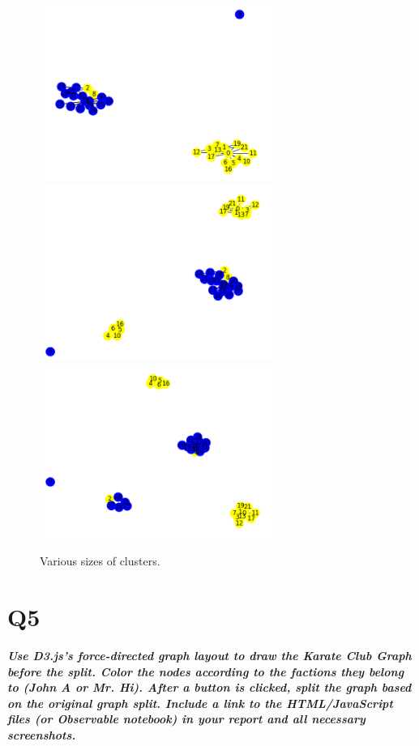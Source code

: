 \documentclass[12pt]{article}
\begin{document}
\\
\begin{figure} 
{\includegraphics[width = 3in]{Figure_13.png}}
{\includegraphics[width = 3in]{Figure_14.png}} 
{\includegraphics[width = 3in]{Figure_15.png}}
\caption{Various sizes of clusters.}
\label{some example}
\end{figure}
\clearpage

\clearpage

\section*{Q5}

\emph{ \textbf{Use D3.js's force-directed graph layout to draw the Karate Club Graph before the split. Color the nodes according to the factions they belong to (John A or Mr. Hi). After a button is clicked, split the graph based on the original graph split. Include a link to the HTML/JavaScript files (or Observable notebook) in your report and all necessary screenshots.}}
\end{document}
